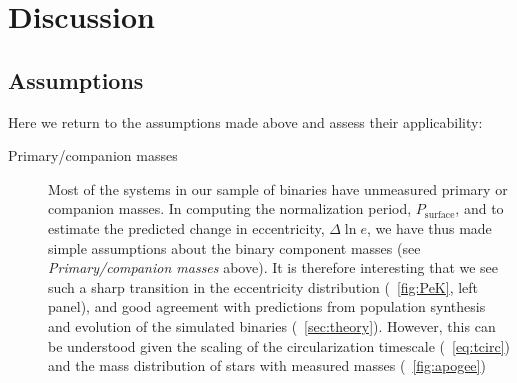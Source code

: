 \documentclass[modern, letterpaper]{aastex62}
\newcommand{\Psurf}{\ensuremath{P_\textrm{surface}}}
\begin{document}
\section{Discussion} \label{sec:discussion}

\subsection{Assumptions}

Here we return to the assumptions made above and assess their applicability:
\begin{description}
    \item[Primary/companion masses] Most of the systems in our sample of
    binaries have unmeasured primary or companion masses.
    In computing the normalization period, \Psurf, and to estimate the predicted
    change in eccentricity, $\Delta \ln e$, we have thus made simple assumptions
    about the binary component masses (see \emph{Primary/companion masses}
    above).
    It is therefore interesting that we see such a sharp transition in the
    eccentricity distribution (\figurename~\ref{fig:PeK}, left panel), and good
    agreement with predictions from population synthesis and evolution of the
    simulated binaries (\sectionname~\ref{sec:theory}).
    However, this can be understood given the scaling of the circularization
    timescale (\eqname~\ref{eq:tcirc}) and the mass distribution of stars with
    measured masses (\figurename~\ref{fig:apogee})


\end{description}
\end{document}
